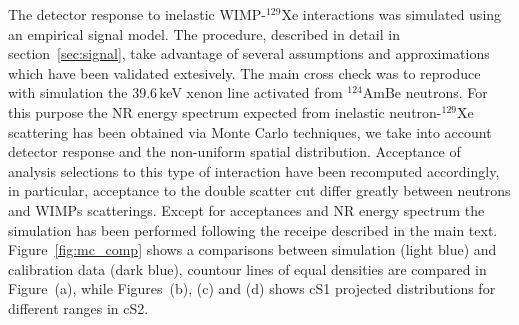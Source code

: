 The detector response to inelastic WIMP-$^{129}$Xe interactions was simulated using an empirical signal model. 
The procedure, described in detail in section~\ref{sec:signal}, take advantage of several 
assumptions and approximations which have been validated extesively. 
The main cross check was to reproduce with simulation the 39.6\,keV xenon line activated from $^{124}$AmBe neutrons. 
For this purpose the NR energy spectrum expected from inelastic neutron-$^{129}$Xe scattering has been obtained via  Monte Carlo techniques, 
we take into account detector response and the non-uniform spatial distribution. Acceptance of analysis selections to this type of interaction 
have been recomputed accordingly, in particular, acceptance to the double scatter cut differ greatly between neutrons and WIMPs scatterings. 
Except for acceptances and NR energy spectrum the simulation has been performed following the receipe described in the main text. Figure~\ref{fig:mc_comp}
shows a comparisons between simulation (light blue) and calibration data (dark blue), countour lines of equal densities are compared in Figure~(a), 
while Figures~(b), (c) and (d) shows cS1 projected distributions for different ranges in cS2.



